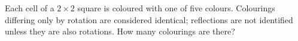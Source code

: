 Each cell of a $2\times2$ square is coloured with one of five colours. Colourings differing only by rotation are considered identical; reflections are not identified unless they are also rotations. How many colourings are there?
